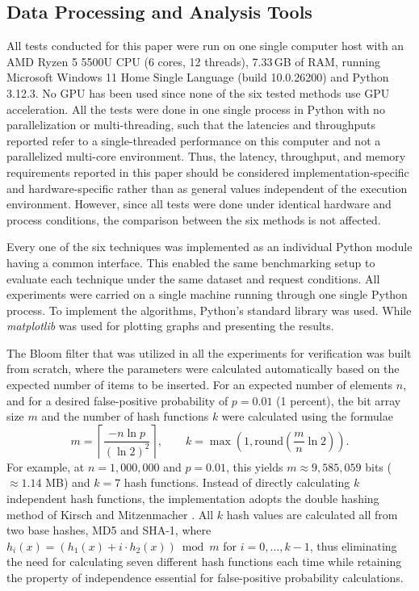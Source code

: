 \documentclass[conference]{IEEEtran}
\begin{document}
\subsection{Data Processing and Analysis Tools}
All tests conducted for this paper were run on one single computer
host with an AMD Ryzen 5 5500U CPU (6 cores, 12 threads), 7.33\,GB
of RAM, running Microsoft Windows 11 Home Single Language (build
10.0.26200) and Python 3.12.3. No GPU has been used since none of
the six tested methods use GPU acceleration. All the tests were done
in one single process in Python with no parallelization or
multi-threading, such that the latencies and throughputs reported
refer to a single-threaded performance on this computer and not a
parallelized multi-core environment. Thus, the latency, throughput,
and memory requirements reported in this paper should be considered
implementation-specific and hardware-specific rather than as general
values independent of the execution environment. However, since all
tests were done under identical hardware and process conditions, the
comparison between the six methods is not affected.

Every one of the six techniques was implemented as an individual Python module having a common interface. This enabled the same benchmarking setup to evaluate each technique under the same dataset and request conditions. All experiments were carried on a single machine running through one single Python process. To implement the algorithms, Python's standard library was used. While \textit{matplotlib} was used for plotting graphs and presenting the results.

The Bloom filter that was utilized in all the experiments for verification was built from scratch, where the parameters were calculated automatically based on the expected number of items to be inserted. For an expected number of elements $n$, and for a desired false-positive probability of $p = 0.01$ (1 percent), the bit array size $m$ and the number of hash functions $k$ were calculated using the formulae
\begin{equation}
m = \left\lceil \frac{-n \ln p}{(\ln 2)^2} \right\rceil, \qquad
k = \max\left(1, \text{round}\left(\frac{m}{n}\ln 2\right)\right).
\end{equation}
For example, at $n = 1{,}000{,}000$ and $p = 0.01$, this yields
$m \approx 9{,}585{,}059$ bits ($\approx 1.14$ MB) and $k = 7$ hash
functions. Instead of directly calculating $k$ independent hash functions,
the implementation adopts the double hashing method of Kirsch and Mitzenmacher \cite{b8}. All $k$ hash values are calculated all from two base hashes, MD5 and SHA-1, where $h_i(x) = (h_1(x) + i
\cdot h_2(x)) \bmod m$ for $i = 0, \dots, k-1$, thus eliminating the need for calculating seven different hash functions each time while retaining
the property of independence essential for false-positive probability
calculations. 
\end{document}

